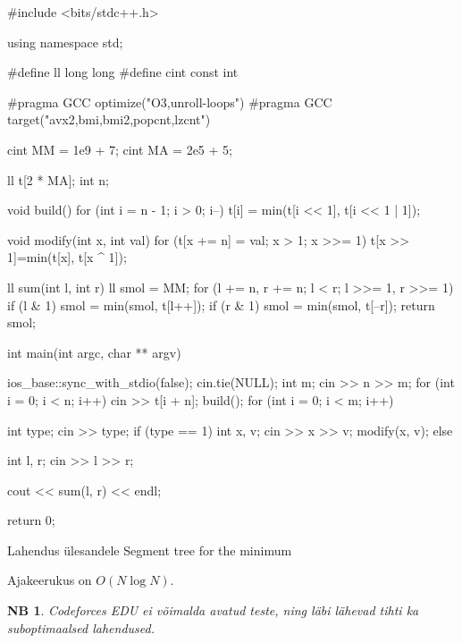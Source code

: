 \documentclass{trkut}
\newtheorem*{extra}{NB}
\begin{document}
\begin{cclol}
#include <bits/stdc++.h>

using namespace std;

#define ll long long
#define cint
const int

#pragma GCC optimize("O3,unroll-loops")
#pragma GCC target("avx2,bmi,bmi2,popcnt,lzcnt")

cint MM = 1e9 + 7;
cint MA = 2e5 + 5;

ll t[2 * MA];
int n;

void build() {
  for (int i = n - 1; i > 0; i--) {
    t[i] = min(t[i << 1], t[i << 1 | 1]);
  }
}

void modify(int x, int val) {
for (t[x += n] = val; x > 1; x >>= 1) t[x >> 1]=min(t[x], t[x ^ 1]);
}

ll sum(int l, int r) {
  ll smol = MM;
  for (l += n, r += n; l < r; l >>= 1, r >>= 1) {
    if (l & 1) smol = min(smol, t[l++]);
    if (r & 1) smol = min(smol, t[--r]);
  }
  return smol;
}

int main(int argc, char ** argv) {
  ios_base::sync_with_stdio(false);
  cin.tie(NULL);
  int m;
  cin >> n >> m;
  for (int i = 0; i < n; i++) {
    cin >> t[i + n];
  }
  build();
  for (int i = 0; i < m; i++) {
    int type;
    cin >> type;
    if (type == 1) {
      int x, v;
      cin >> x >> v;
      modify(x, v);
    } else {
      int l, r;
      cin >> l >> r;

      cout << sum(l, r) << endl;
    }
  }

  return 0;
}
    \end{cclol}
    \begin{kk}[H]
    \caption{Lahendus ülesandele Segment tree for the minimum}%
    \end{kk}
    
Ajakeerukus on $O(N\log N)$.

\begin{extra}%
Codeforces EDU ei võimalda avatud teste, ning läbi lähevad tihti ka suboptimaalsed lahendused.
\end{extra}
\end{document}
